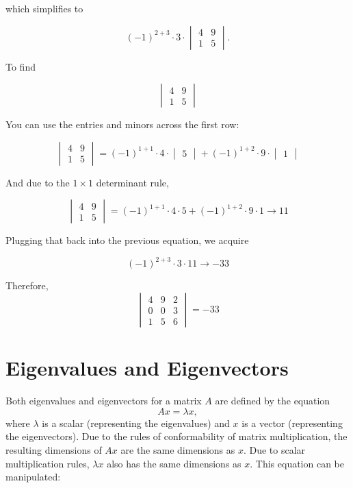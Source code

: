 \documentclass{article}
\begin{document}
which simplifies to

\[
(-1)^{2+3} \cdot 3 \cdot \begin{vmatrix} 4 & 9 \\ 1 & 5 \end{vmatrix}.
\]

To find

\[
\begin{vmatrix} 4 & 9 \\ 1 & 5 \end{vmatrix}
\]

You can use the entries and minors across the first row:

\[
\begin{vmatrix} 4 & 9 \\ 1 & 5 \end{vmatrix} = (-1)^{1+1} \cdot 4 \cdot \begin{vmatrix} 5 \end{vmatrix} + (-1)^{1+2} \cdot 9 \cdot \begin{vmatrix} 1 \end{vmatrix}
\]

And due to the $1 \times 1$ determinant rule,

\[
\begin{vmatrix} 4 & 9 \\ 1 & 5 \end{vmatrix} = (-1)^{1+1} \cdot 4 \cdot 5 + (-1)^{1+2} \cdot 9 \cdot 1 \rightarrow 11
\]

Plugging that back into the previous equation, we acquire

\[
(-1)^{2+3} \cdot 3 \cdot 11 \rightarrow -33
\]

Therefore, \[
\begin{vmatrix}
4 & 9 & 2 \\
0 & 0 & 3 \\
1 & 5 & 6
\end{vmatrix}
= -33
\]

\section*{Eigenvalues and Eigenvectors}

Both eigenvalues and eigenvectors for a matrix \( A \) are defined by the equation
\[
A x = \lambda x,
\]
where \( \lambda \) is a scalar (representing the eigenvalues) and \( x \) is a vector (representing the eigenvectors). Due to the rules of conformability of matrix multiplication, the resulting dimensions of \( A x \) are the same dimensions as \( x \). Due to scalar multiplication rules, \( \lambda x \) also has the same dimensions as \( x \). This equation can be manipulated:
\end{document}
